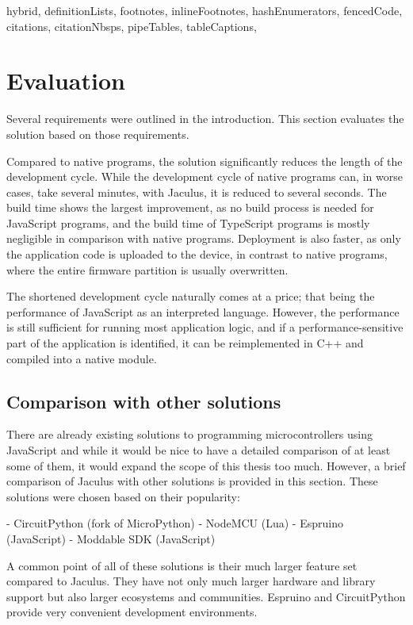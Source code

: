\begin{markdown*}{%
  hybrid,
  definitionLists,
  footnotes,
  inlineFootnotes,
  hashEnumerators,
  fencedCode,
  citations,
  citationNbsps,
  pipeTables,
  tableCaptions,
}


\chapter{Evaluation}

Several requirements were outlined in the introduction. This section evaluates the solution based on those requirements.

Compared to native programs, the solution significantly reduces the length of the development cycle. While the development cycle of native programs can, in worse cases, take several minutes, with Jaculus, it is reduced to several seconds. The build time shows the largest improvement, as no build process is needed for JavaScript programs, and the build time of TypeScript programs is mostly negligible in comparison with native programs. Deployment is also faster, as only the application code is uploaded to the device, in contrast to native programs, where the entire firmware partition is usually overwritten.

The shortened development cycle naturally comes at a price; that being the performance of JavaScript as an interpreted language. However, the performance is still sufficient for running most application logic, and if a performance-sensitive part of the application is identified, it can be reimplemented in C++ and compiled into a native module.

\section{Comparison with other solutions}

There are already existing solutions to programming microcontrollers using JavaScript and while it would be nice to have a detailed comparison of at least some of them, it would expand the scope of this thesis too much. However, a brief comparison of Jaculus with other solutions is provided in this section. These solutions were chosen based on their popularity:

- CircuitPython (fork of MicroPython)
- NodeMCU (Lua)
- Espruino (JavaScript)
- Moddable SDK (JavaScript)

A common point of all of these solutions is their much larger feature set compared to Jaculus. They have not only much larger hardware and library support but also larger ecosystems and communities. Espruino and CircuitPython provide very convenient development environments.


\end{markdown*}
